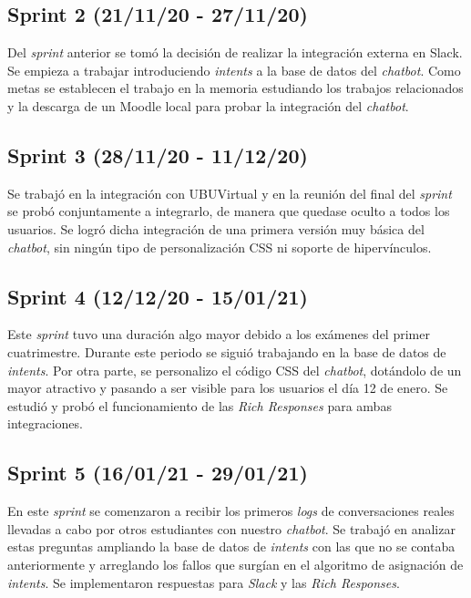 \subsection{Sprint 2 (21/11/20 - 27/11/20)}

Del \textit{sprint} anterior se tomó la decisión de realizar la integración externa en Slack. Se empieza a trabajar introduciendo \textit{intents} a la base de datos del \textit{chatbot}.
Como metas se establecen el trabajo en la memoria estudiando los trabajos relacionados y la descarga de un Moodle local para probar la integración del \textit{chatbot}.

\subsection{Sprint 3 (28/11/20 - 11/12/20)}
 
Se trabajó en la integración con UBUVirtual y en la reunión del final del \textit{sprint} se probó conjuntamente a integrarlo, de manera que quedase oculto a todos los usuarios. 
Se logró dicha integración de una primera versión muy básica del \textit{chatbot}, sin ningún tipo de personalización CSS ni soporte de hipervínculos.

\subsection{Sprint 4 (12/12/20 - 15/01/21)}

Este \textit{sprint} tuvo una duración algo mayor debido a los exámenes del primer cuatrimestre. Durante este periodo se siguió trabajando en la base de datos de \textit{intents}. Por otra parte, se personalizo el código CSS del \textit{chatbot}, dotándolo de un mayor atractivo y pasando a ser visible para los usuarios el día 12 de enero. Se estudió y probó el funcionamiento de las \textit{Rich Responses} para ambas integraciones.

\subsection{Sprint 5 (16/01/21 - 29/01/21)}

En este \textit{sprint} se comenzaron a recibir los primeros \textit{logs} de conversaciones reales llevadas a cabo por otros estudiantes con nuestro \textit{chatbot}. Se trabajó en analizar estas preguntas ampliando la base de datos de \textit{intents} con las que no se contaba anteriormente y arreglando los fallos que surgían en el algoritmo de asignación de \textit{intents}. Se implementaron respuestas para \textit{Slack} y las \textit{Rich Responses}.

